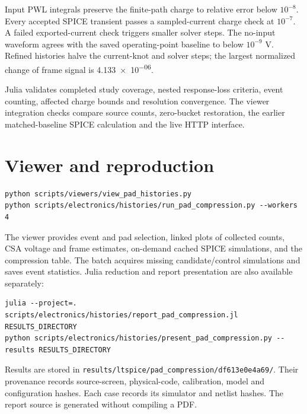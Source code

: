 \documentclass[11pt,a4paper]{article}
\begin{document}
Input PWL integrals preserve the finite-path charge to relative error below
$10^{-8}$. Every accepted SPICE transient passes a sampled-current charge check
at $10^{-7}$. A failed exported-current check triggers smaller solver steps.
The no-input waveform agrees with the saved operating-point baseline to below
$10^{-9}$ V. Refined histories halve the current-knot and solver steps; the
largest normalized change of frame signal is \num{4.133e-06}.

Julia validates completed study coverage, nested response-loss criteria, event
counting, affected charge bounds and resolution convergence. The viewer
integration checks compare source counts, zero-bucket restoration, the earlier
matched-baseline SPICE calculation and the live HTTP interface.

\section{Viewer and reproduction}
\begin{verbatim}
python scripts/viewers/view_pad_histories.py
python scripts/electronics/histories/run_pad_compression.py --workers 4
\end{verbatim}
The viewer provides event and pad selection, linked plots of collected counts,
CSA voltage and frame estimates, on-demand cached SPICE simulations, and the
compression table. The batch acquires missing candidate/control simulations and
saves event statistics. Julia reduction and report presentation are also
available separately:
\begin{verbatim}
julia --project=. scripts/electronics/histories/report_pad_compression.jl RESULTS_DIRECTORY
python scripts/electronics/histories/present_pad_compression.py --results RESULTS_DIRECTORY
\end{verbatim}
Results are stored in \texttt{results/ltspice/pad\_compression/df613e0e4a69/}.
Their provenance records source-screen, physical-code, calibration, model and
configuration hashes. Each case records its simulator and netlist hashes.
The report source is generated without compiling a PDF.
\end{document}
